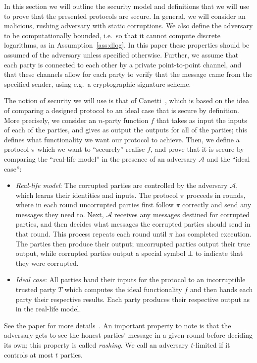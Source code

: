 \documentclass{article}
\newcommand\paper{paper}
\theoremstyle{remark}
\begin{document}
\newcommand{\ideal}[4]{\textup{\texttt{IDEAL}}_{#1, #2} (#3, #4)}
\newcommand{\idealD}{\ideal{\proto}{\mathcal{S}}{x}{z}}

In this section we will outline the security model and definitions that we will
use to prove that the presented protocols are secure. In general, we will
consider an malicious, rushing adversary with static corruptions. We also
define the adversary to be computationally bounded, i.e.\ so that it cannot
compute discrete logarithms, as in Assumption~\ref{ass:dlog}. In this \paper{}
these properties should be assumed of the adversary unless specified otherwise.
Further, we assume that each party is connected to each other by a private
point-to-point channel, and that these channels allow for each party to verify
that the message came from the specified sender, using e.g.\ a cryptographic
signature scheme.

The notion of security we will use is that of Canetti~\cite{c00}, which is
based on the idea of comparing a designed protocol to an ideal case that is
secure by definition. More precisely, we consider an $n$-party function $f$
that takes as input the inputs of each of the parties, and gives as output the
outputs for all of the parties; this defines what functionality we want our
protocol to achieve. Then, we define a protocol $\pi$ which we want to
``securely'' realise $f$, and prove that it is secure by comparing the
``real-life model'' in the presence of an adversary $\mathcal{A}$ and the
``ideal case'':
\begin{itemize}
	\item \textit{Real-life model}: The corrupted parties are controlled by the
		adversary $\mathcal{A}$, which learns their identities and inputs. The
		protocol $\pi$ proceeds in rounds, where in each round uncorrupted
		parties first follow $\pi$ correctly and send any messages they need
		to. Next, $\mathcal{A}$ receives any messages destined for corrupted
		parties, and then decides what messages the corrupted parties should
		send in that round. This process repeats each round until $\pi$ has
		completed execution. The parties then produce their output; uncorrupted
		parties output their true output, while corrupted parties output a
		special symbol $\bot$ to indicate that they were corrupted.

	\item \textit{Ideal case}: All parties hand their inputs for the protocol
		to an incorruptible trusted party $T$ which computes the ideal
		functionality $f$ and then hands each party their respective results.
		Each party produces their respective output as in the real-life model.
\end{itemize}
See the paper for more details~\cite{c00}. An important property to note is
that the adversary gets to see the honest parties' message in a given round
before deciding its own; this property is called \textit{rushing}. We call an
adversary $t$-limited if it controls at most $t$ parties.
\end{document}
